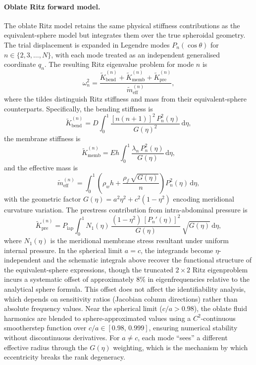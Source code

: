 \paragraph{Oblate Ritz forward model.}
The oblate Ritz model retains the same physical stiffness contributions as
the equivalent-sphere model but integrates them over the true spheroidal
geometry.  The trial displacement is expanded in Legendre modes
$P_n(\cos\theta)$ for $n \in \{2,3,\ldots,N\}$, with each mode treated as
an independent generalised coordinate $q_n$.  The resulting Ritz eigenvalue
problem for mode $n$ is
\begin{equation}\label{eq:ritz_eigenvalue}
  \omega_n^2
  =
  \frac{\tilde K_\mathrm{bend}^{(n)}
      + \tilde K_\mathrm{memb}^{(n)}
      + \tilde K_\mathrm{pre}^{(n)}}
       {\tilde m_\mathrm{eff}^{(n)}},
\end{equation}
where the tildes distinguish Ritz stiffness and mass from their
equivalent-sphere counterparts.  Specifically, the bending stiffness is
\begin{equation}\label{eq:ritz_bend}
  \tilde K_\mathrm{bend}^{(n)}
  =
  D \int_0^1
    \frac{[n(n+1)]^2\,P_n^2(\eta)}{G(\eta)^2}
  \,\mathrm{d}\eta,
\end{equation}
the membrane stiffness is
\begin{equation}\label{eq:ritz_memb}
  \tilde K_\mathrm{memb}^{(n)}
  =
  Eh \int_0^1
    \frac{\lambda_n\,P_n^2(\eta)}{G(\eta)}
  \,\mathrm{d}\eta,
\end{equation}
and the effective mass is
\begin{equation}\label{eq:ritz_mass}
  \tilde m_\mathrm{eff}^{(n)}
  =
  \int_0^1
    \left(\rho_w h + \frac{\rho_f\,\sqrt{G(\eta)}}{n}\right)
    P_n^2(\eta)
  \,\mathrm{d}\eta,
\end{equation}
with the geometric factor $G(\eta) = a^2\eta^2 + c^2(1-\eta^2)$ encoding
meridional curvature variation.  The prestress contribution from
intra-abdominal pressure is
\begin{equation}\label{eq:ritz_pre}
  \tilde K_\mathrm{pre}^{(n)}
  =
  P_\mathrm{iap} \int_0^1
    N_1(\eta)\,\frac{(1-\eta^2)\,[P_n'(\eta)]^2}{G(\eta)}
  \,\sqrt{G(\eta)}\,\mathrm{d}\eta,
\end{equation}
where $N_1(\eta)$ is the meridional membrane stress resultant under
uniform internal pressure.
In the spherical limit $a = c$, the integrands become
$\eta$-independent and the schematic integrals above recover the functional
structure of the equivalent-sphere expressions, though the truncated
$2\times2$ Ritz eigenproblem incurs a systematic offset of approximately
$8\%$ in eigenfrequencies relative to the analytical sphere formula.  This
offset does not affect the identifiability analysis, which depends on
sensitivity ratios (Jacobian column directions) rather than absolute
frequency values.  Near the spherical limit ($c/a > 0.98$),
the oblate fluid harmonics are blended to sphere-approximated values using a
$C^2$-continuous smootherstep function over $c/a \in [0.98,\,0.999]$, ensuring
numerical stability without discontinuous derivatives.
For $a \neq c$, each mode
``sees'' a different effective radius through the $G(\eta)$ weighting,
which is the mechanism by which eccentricity breaks the rank degeneracy.

